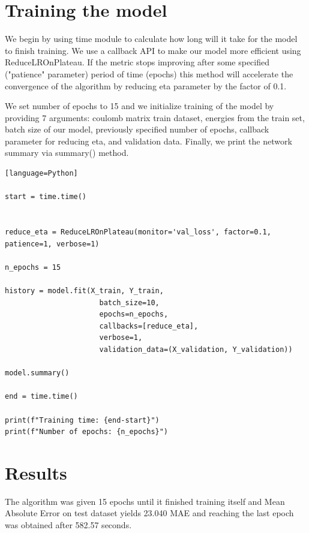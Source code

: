 \documentclass[a4paper,oneside,openright,11pt]{book}
\begin{document}
\section{Training the model}


We begin by using time module to calculate how long will it take for the model to finish training. We use a callback API to make our model more efficient using ReduceLROnPlateau. If the metric stops improving after some specified ("patience" parameter) period of time (epochs) this method will accelerate the convergence of the algorithm by reducing eta parameter by the factor of 0.1.

We set number of epochs to 15 and we initialize training of the model by providing 7 arguments: coulomb matrix train dataset, energies from the train set, batch size of our model, previously specified number of epochs, callback parameter for reducing eta, and validation data. Finally, we print the network summary via summary() method.

\begin{verbatim}[language=Python]

start = time.time()


reduce_eta = ReduceLROnPlateau(monitor='val_loss', factor=0.1, patience=1, verbose=1)

n_epochs = 15

history = model.fit(X_train, Y_train,
                      batch_size=10,
                      epochs=n_epochs, 
                      callbacks=[reduce_eta],
                      verbose=1,
                      validation_data=(X_validation, Y_validation))

model.summary()

end = time.time()

print(f"Training time: {end-start}")
print(f"Number of epochs: {n_epochs}")

\end{verbatim}

\section{Results}


The algorithm was given 15 epochs until it finished training itself and Mean Absolute Error on test dataset yields 23.040 MAE and reaching the last epoch was obtained after 582.57 seconds.
\end{document}
